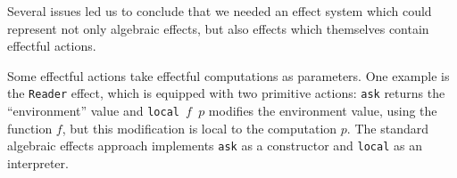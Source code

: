 \documentclass[acmsmall,fleqn,12pt]{acmart}
\begin{document}
Several issues led us to conclude that we needed an effect system which could
represent not only algebraic effects, but also effects which themselves contain
effectful actions.

%
%
%
%

Some effectful actions take effectful computations as parameters. One example is the
\texttt{Reader} effect, which is equipped with two primitive actions:
\texttt{ask} returns the ``environment'' value and \texttt{local $f$ $p$}
modifies the environment value, using the function $f$, but this modification
is local to the computation $p$. The standard algebraic effects approach implements
\texttt{ask} as a constructor and \texttt{local} as an interpreter.
\end{document}
